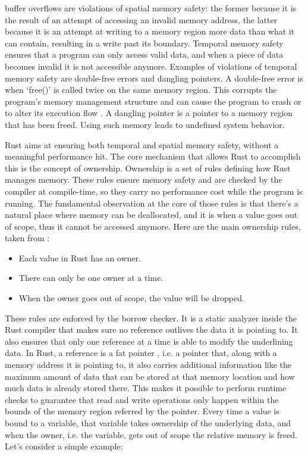 \documentclass{report}
\begin{document}
buffer overflows are violations of spatial memory safety: the former because it is the result of an attempt of accessing an invalid memory address, the latter because it is an
attempt at writing to a memory region more data than what it can contain, resulting in a write past its boundary. Temporal memory safety ensures that a program
can only access valid data, and when a piece of data becomes invalid it is not accessible anymore. Examples of violations of temporal memory safety are double-free errors and
dangling pointers. A double-free error is when \enquote*{free()} is called twice on the same memory region. This corrupts the program's memory management structure and can cause
the program to crash or to alter its execution flow \cite{double-free}. A dangling pointer is a pointer to a memory region that has been freed. Using such memory leads to undefined
system behavior. \par

Rust aims at ensuring both temporal and spatial memory safety, without a meaningful performance hit. The core mechanism that allows Rust to accomplish this is the concept of
ownership. Ownership is a set of rules defining how Rust manages memory. These rules ensure memory safety and are checked by the compiler at compile-time, so they carry no
performance cost while the program is running. The fundamental observation at the core of those rules is that there's a natural place where memory can be deallocated, and it is when
a value goes out of scope, thus it cannot be accessed anymore. Here are the main ownership rules, taken from \cite{rust_ownership_rules}:

		\begin{itemize}
				\item Each value in Rust has an owner.
				\item There can only be one owner at a time.
				\item When the owner goes out of scope, the value will be dropped.
		\end{itemize}

These rules are enforced by the borrow checker. It is a static analyzer inside the Rust compiler that makes sure no reference outlives the data it is pointing to. It also ensures
that only one reference at a time is able to modify the underlining data. In Rust, a reference is a fat pointer \cite{eternal-war-in-memory}, i.e. a pointer that, along with a memory address it
is pointing to, it also carries additional information like the maximum amount of data that can be stored at that memory location and how much data is already stored there. This
makes it possible to perform runtime checks to guarantee that read and write operations only happen within the bounds of the memory region referred by the pointer. 
Every time a value is bound to a variable, that variable takes ownership of the underlying data, and when the owner, i.e. the variable, gets out of scope the relative memory is
freed. Let's consider a simple example:
\end{document}
